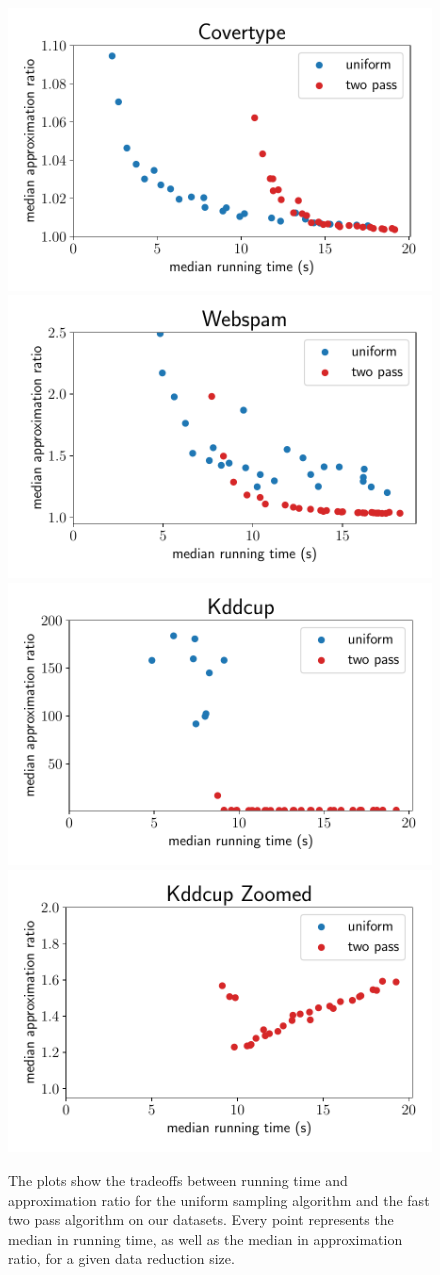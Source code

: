 \begin{figure}[t]
    \centering
    \includegraphics[width=.49\linewidth]{figures/covertype_runtime_plot.pdf}
    \includegraphics[width=.49\linewidth]{figures/webspam_runtime_plot.pdf}
    \includegraphics[width=.49\linewidth]{figures/kddcup_runtime_plot.pdf}
    \includegraphics[width=.49\linewidth]{figures/kddcup_runtime_plot_zoomed.pdf}
    \caption{The plots show the tradeoffs between running time and
        approximation ratio for the uniform sampling algorithm and the
        fast two pass algorithm on our datasets.
        Every point represents the median in running time, as well
        as the median in approximation ratio, for a given
        data reduction size.
    }
    \label{fig:runtime-plots}
\end{figure}

